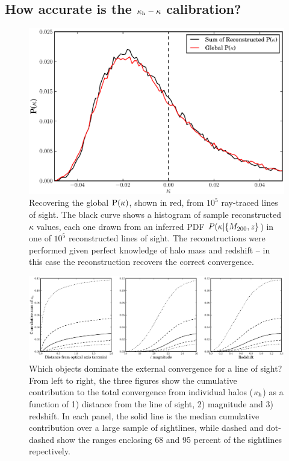 \documentclass[useAMS,usenatbib]{mn2e}
\begin{document}

\subsection{How accurate is the $\kappa_{\rm h} - \kappa$ calibration?}

\begin{figure}
\includegraphics[width=\columnwidth]{figs/globaldist.eps}
\caption[magcut]{Recovering the global ${\rm P}(\kappa)$, shown in red, 
from $10^{5}$ ray-traced lines of
sight. The black curve shows a histogram of 
sample reconstructed 
$\kappa$ values, each one drawn from an inferred PDF 
$P(\kappa|\{M_{200},z\}$)
in one of $10^{5}$ reconstructed lines of sight. 
The reconstructions were performed given
perfect knowledge of halo mass and redshift -- in this case
the reconstruction recovers the correct convergence.}
\label{fig:globaldist}
\end{figure}

\begin{figure}
\includegraphics[width=\textwidth]{figs/where_is_the_kappa.eps}
\caption[magcut]{Which objects dominate the external convergence for a line of
sight? From left to right, the three figures show the cumulative contribution
to the total  convergence from individual halos ($\kappa_{\rm h}$) as a function of
1)  distance from the line of sight, 2) magnitude and 3) redshift.   In each
panel, the solid line is the median cumulative contribution over a large
sample of sightlines, while dashed and dot-dashed show the ranges enclosing 68
and 95 percent of the sightlines repectively.}
\label{fig:where}
\end{figure}
\end{document}
